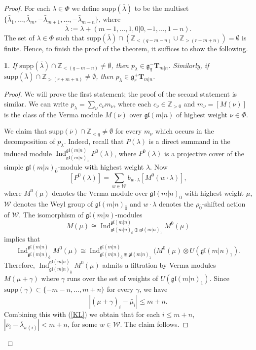 \documentclass[12pt,oneside,english]{amsart}
\numberwithin{equation}{section}
\numberwithin{figure}{section}
\theoremstyle{plain}
\theoremstyle{plain}
\newtheorem{lem}[thm]{\protect\lemmaname}
\theoremstyle{remark}
\theoremstyle{definition}
\theoremstyle{plain}
\theoremstyle{remark}
\theoremstyle{definition}
\theoremstyle{plain}
\theoremstyle{plain}
\theoremstyle{definition}
\providecommand{\lemmaname}{Lemma}
\newcommand{\bT}{\mathbf{T}}
\begin{document}
\begin{proof}
For each $\lambda\in\Phi$ we define $\mathrm{supp}(\bar{\lambda})$ to be the multiset $\{\bar\lambda_1,\ldots,\bar\lambda_m,-\bar\lambda_{m+1},\ldots,-\bar\lambda_{m+n}\}$, where
$$\bar\lambda:=\lambda+(m-1,\dots,1,0|0,-1,\dots,1-n).$$
The set of $\lambda\in\Phi$ such that
 $\mathrm{supp}(\bar{\lambda})\cap(\mathbb{Z}_ {<(q-m-n)}\cup\mathbb{Z}_ {>(r+m+n)})=\emptyset$ is finite.
Hence, to finish the proof of the theorem, it suffices to show the following.

\begin{lem}\label{lemma for thm} If $\mathrm{supp}(\bar{\lambda})\cap\mathbb{Z}_ {<(q-m-n)}\neq\emptyset$, then $p_\lambda\in\mathfrak{g}_{q}^-\bT_{m|n}$. Similarly, if
$\mathrm{supp}(\bar{\lambda})\cap\mathbb{Z}_ {>(r+m+n)}\neq\emptyset$, then $p_\lambda\in\mathfrak{g}_{r}^+\bT_{m|n}$.
\end{lem}
\begin{proof}  We will prove the first statement; the proof of the second statement is similar.
  We can write $p_\lambda=\sum_{\nu}c_{\nu}m_{\nu}$, where each $c_\nu\in\mathbb{Z}_{>0}$ and $m_{\nu}=[M(\nu)]$ is the class of the Verma module $M(\nu)$ over $\mathfrak{gl}(m|n)$ of highest weight $\nu\in\Phi$.

We claim that  $\mathrm{supp}(\bar{\nu})\cap\mathbb{Z}_ {<q}\neq\emptyset$ for every $m_\nu$ which occurs in the decomposition of   $p_\lambda$.
Indeed, recall that $P(\lambda)$ is a direct
    summand in the induced module $\operatorname{Ind}^{\mathfrak{gl}(m|n)}_{\mathfrak{gl}(m|n)_{\bar 0}}P^0(\lambda)$, where $P^0(\lambda)$ is a projective cover of the simple
    $\mathfrak{gl}(m|n)_{\bar 0}$-module with highest weight $\lambda$. Now
\begin{equation}\label{KL}
  [P^0(\lambda)]=\sum_{w\in \mathcal W}b_{w\cdot \lambda}[M^0({w\cdot\lambda})],
  \end{equation}
    where $M^0({\mu})$ denotes the Verma module over $\mathfrak{gl}(m|n)_{\bar 0}$ with highest weight $\mu$, $\mathcal W$ denotes the Weyl group of  $\mathfrak{gl}(m|n)_{\bar 0}$ and $w\cdot\lambda$ denotes the $\rho_{\bar{0}}$-shifted action of $\mathcal W$. The isomorphism of $\mathfrak{gl}(m|n)$-modules
    $$M({\mu})\cong \operatorname{Ind}^{\mathfrak{gl}(m|n)}_{\mathfrak{gl}(m|n)_{\bar 0}\oplus \mathfrak{gl}(m|n)_1}M^0(\mu)$$
    implies that
    $$\operatorname{Ind}^{\mathfrak{gl}(m|n)}_{\mathfrak{gl}(m|n)_{\bar 0}}M^0(\mu)\cong \operatorname{Ind}^{\mathfrak{gl}(m|n)}_{\mathfrak{gl}(m|n)_{\bar 0}\oplus \mathfrak{gl}(m|n)_1}(M^0(\mu)\otimes U(\mathfrak{gl}(m|n)_1).$$
    Therefore, $\operatorname{Ind}^{\mathfrak{gl}(m|n)}_{\mathfrak{gl}(m|n)_{\bar 0}}M^0(\mu)$ admits a filtration by Verma modules $M({\mu+\gamma})$ where $\gamma$ runs over the set of
    weights of $U(\mathfrak{gl}(m|n)_1)$. Since $\mathrm{supp}(\gamma)\subset\{-m-n,\dots,m+n\}$ for every $\gamma$, we have  $$|(\overline{\mu+\gamma})_i-\bar{\mu}_i|\leq m+n.$$ Combining this with (\ref{KL}) we obtain that for each
    $i\leq m+n$, $|\bar\nu_i-\bar\lambda_{w(i)}|<m+n$, for some $w\in\mathcal W$. The claim follows.




\end{proof}
\end{proof}
\end{document}
